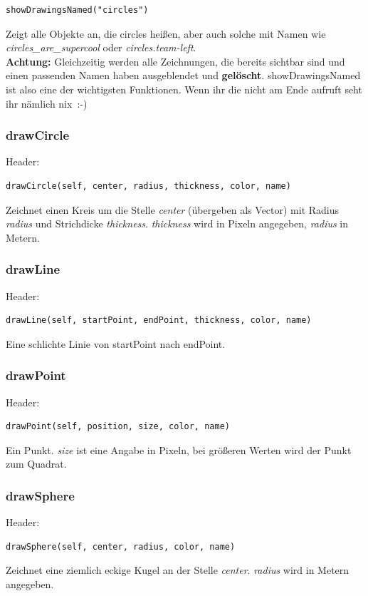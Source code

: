 \begin{verbatim}showDrawingsNamed("circles")
\end{verbatim}
Zeigt alle Objekte an, die \grqq circles\grqq{} heißen, aber auch solche mit Namen wie \textit{\grqq circles\_are\_supercool\grqq{}} oder \textit{\grqq circles.team-left\grqq{}}.\\
\textbf{Achtung:} Gleichzeitig werden alle Zeichnungen, die bereits sichtbar sind und einen passenden Namen haben ausgeblendet und \textbf{gelöscht}. showDrawingsNamed ist also eine der wichtigsten Funktionen. Wenn ihr die nicht am Ende aufruft seht ihr nämlich nix~:-) 

\subsubsection*{drawCircle}
Header:

\begin{verbatim}drawCircle(self, center, radius, thickness, color, name)
\end{verbatim}
Zeichnet einen Kreis um die Stelle \textit{center} (übergeben als Vector) mit Radius \textit{radius} und Strichdicke \textit{thickness}. \textit{thickness} wird in Pixeln angegeben, \textit{radius} in Metern.

\subsubsection*{drawLine}
Header:

\begin{verbatim}drawLine(self, startPoint, endPoint, thickness, color, name)
\end{verbatim}
Eine schlichte Linie von startPoint nach endPoint.

\subsubsection*{drawPoint}
Header:

\begin{verbatim}drawPoint(self, position, size, color, name)
\end{verbatim}
Ein Punkt. \textit{size} ist eine Angabe in Pixeln, bei größeren Werten wird der Punkt zum Quadrat.

\subsubsection*{drawSphere}
Header:

\begin{verbatim}drawSphere(self, center, radius, color, name)
\end{verbatim}
Zeichnet eine ziemlich eckige Kugel an der Stelle \textit{center}. \textit{radius} wird in Metern angegeben. 

